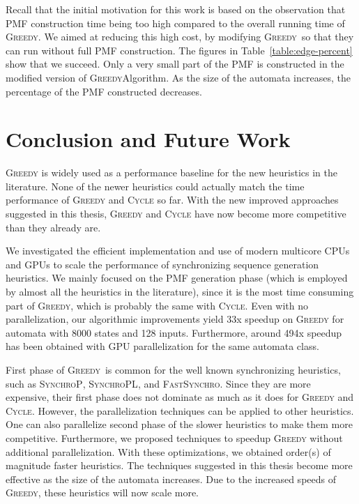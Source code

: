 \documentclass[12pt]{article}
\newcommand{\greedyAlgo}{\textsc{Greedy}}
\begin{document}
Recall that the initial motivation for this work is based on the observation that PMF construction time being too high compared to the overall running time of \greedyAlgo . We aimed at reducing this high cost, by modifying \greedyAlgo\ so that they can run without full PMF construction. The figures in Table~\ref{table:edge-percent} show that we succeed. Only a very small part of the PMF is constructed in the modified version of \greedyAlgo Algorithm. As the size of the automata increases, the percentage of the PMF constructed decreases.

\clearpage
\section{Conclusion and Future Work}
\label{sec:conclusion}

\textsc{Greedy} is widely used as a performance baseline for the new heuristics in the literature. None of the newer heuristics could actually match the time performance of \textsc{Greedy} and \textsc{Cycle} so far. With the new improved approaches suggested in this thesis, \textsc{Greedy} and \textsc{Cycle} have now become more competitive than they already are.

We investigated the efficient implementation and use of modern multicore CPUs and GPUs to scale the performance of synchronizing sequence generation heuristics. We mainly focused on the PMF generation phase (which is employed by almost all the heuristics in the literature), since it is the most time consuming part of \textsc{Greedy}, which is probably the same with \textsc{Cycle}. Even with no parallelization, our algorithmic improvements yield 33x speedup on \textsc{Greedy} for automata with 8000 states and 128 inputs. Furthermore, around 494x speedup has been obtained with GPU parallelization for the same automata class.

First phase of \greedyAlgo\ is common for the well known synchronizing heuristics, such as \textsc{SynchroP}, \textsc{SynchroPL}, and \textsc{FastSynchro}. Since they are more expensive, their first phase does not dominate as much as it does for \textsc{Greedy} and \textsc{Cycle}. However, the parallelization techniques can be applied to other heuristics. One can also parallelize second phase of the slower heuristics to make them more competitive. Furthermore, we proposed techniques to speedup \textsc{Greedy} without additional parallelization. With these optimizations, we obtained order(s) of magnitude faster heuristics. The techniques suggested in this thesis become more effective as the size of the automata increases. Due to the increased speeds of \textsc{Greedy}, these heuristics will now scale more.
\end{document}
